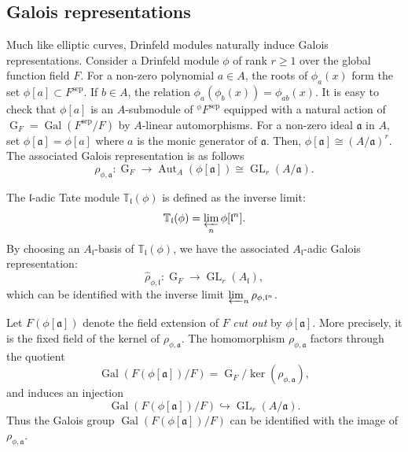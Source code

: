 \documentclass[11pt]{amsart}
\newcommand{\fl}{\mathfrak{l}}
\newcommand{\op}[1]{\operatorname{#1}}
\numberwithin{equation}{section}
\begin{document}
\subsection{Galois representations}

Much like elliptic curves, Drinfeld modules naturally induce Galois representations. Consider a Drinfeld module $\phi$ of rank $ r \geq 1$ over the global function field $ F $. For a non-zero polynomial $ a \in A $, the roots of $\phi_a(x)$ form the set $\phi[a] \subset F^{\op{sep}}$. If $ b \in A $, the relation $\phi_a(\phi_b(x)) = \phi_{ab}(x)$. It is easy to check that $\phi[a]$ is an $A$-submodule of $^\phi F^{\op{sep}}$ equipped with a natural action of $\op{G}_F=\op{Gal}(F^{\op{sep}}/F)$ by $A$-linear automorphisms. For a non-zero ideal $\mathfrak{a}$ in $ A $, set $\phi[\mathfrak{a}] = \phi[a]$ where $ a $ is the monic generator of $\mathfrak{a}$. Then, $\phi[\mathfrak{a}] \cong (A/\mathfrak{a})^r$. The associated Galois representation is as follows
\[
\rho_{\phi, \mathfrak{a}}: \op{G}_F \rightarrow \op{Aut}_A(\phi[\mathfrak{a}]) \cong \op{GL}_r(A/\mathfrak{a}).
\]

The $\fl$-adic Tate module $ \mathbb{T}_\fl(\phi) $ is defined as the inverse limit:
\[
\mathbb{T}_\fl(\phi) = \varprojlim_n \phi[\fl^n].
\]
By choosing an $ A_\fl $-basis of $ \mathbb{T}_\fl(\phi) $, we have the associated $A_\fl$-adic Galois representation:
\[
\hat{\rho}_{\phi, \fl}: \op{G}_F \rightarrow \op{GL}_r(A_\fl),
\]
which can be identified with the inverse limit $\varprojlim_{n} \rho_{\phi, \fl^n}$.
\par Let $F(\phi[\mathfrak{a}])$ denote the field extension of $F$ \emph{cut out} by $\phi[\mathfrak{a}]$. More precisely, it is the fixed field of the kernel of $\rho_{\phi, \mathfrak{a}}$. The homomorphism $\rho_{\phi, \mathfrak{a}}$ factors through the quotient 
\[\op{Gal}(F(\phi[\mathfrak{a}])/F)=\op{G}_F/\op{ker}\left(\rho_{\phi, \mathfrak{a}}\right),\] and induces an injection 
\[\op{Gal}(F(\phi[\mathfrak{a}])/F)\hookrightarrow \op{GL}_r(A/\mathfrak{a}).\] Thus the Galois group $\op{Gal}(F(\phi[\mathfrak{a}])/F)$ can be identified with the image of $\rho_{\phi, \mathfrak{a}}$.
\end{document}
